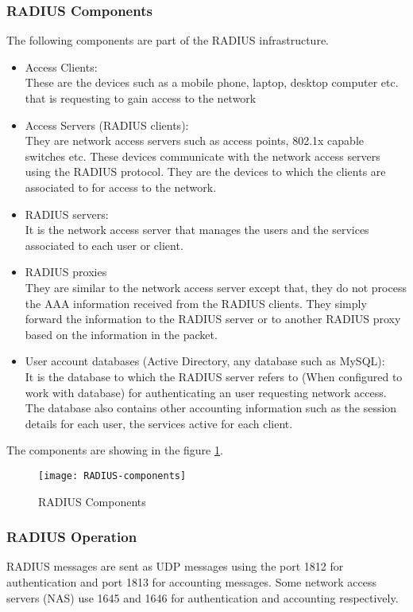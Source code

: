 \subsubsection{RADIUS Components \cite{RADIUS_components}} \label{RADIUS_components}
The following components are part of the RADIUS infrastructure.
\begin{itemize}
	\item Access Clients:
	\\ These are the devices such as a mobile phone, laptop, desktop computer etc. that is requesting to gain access to the network 
	\item Access Servers (RADIUS clients):
	\\ They are network access servers such as access points, 802.1x capable switches etc. These devices communicate with the network access servers using the RADIUS protocol. They are the devices to which the clients are associated to for access to the network.
	\item RADIUS servers:
	\\ It is the network access server that manages the users and the services associated to each user or client.
	\item RADIUS proxies
	\\ They are similar to the network access server except that, they do not process the AAA information received from the RADIUS clients. They simply forward the information to the RADIUS server or to another RADIUS proxy based on the information in the packet.
	\item User account databases (Active Directory, any database such as MySQL):
	\\ It is the database to which the RADIUS server refers to (When configured to work with database) for authenticating an user requesting network access. The database also contains other accounting information such as the session details for each user, the services active for each client. 
	
\end{itemize}
The components are showing in the figure \ref{fig:RADIUS_components_img}.

\begin{figure}
	\centering
	\texttt{[image: RADIUS-components]}
	\caption {RADIUS Components \cite{RADIUS_components_img}}
	\label{fig:RADIUS_components_img}
	\vspace{-10pt}
\end{figure}
\subsubsection{RADIUS Operation \cite{RADIUS_components}} \label{RADIUS_Operations}
RADIUS messages are sent as UDP messages using the port 1812 for authentication and port 1813 for accounting messages. Some network access servers (NAS) use 1645 and 1646 for authentication and accounting respectively.


